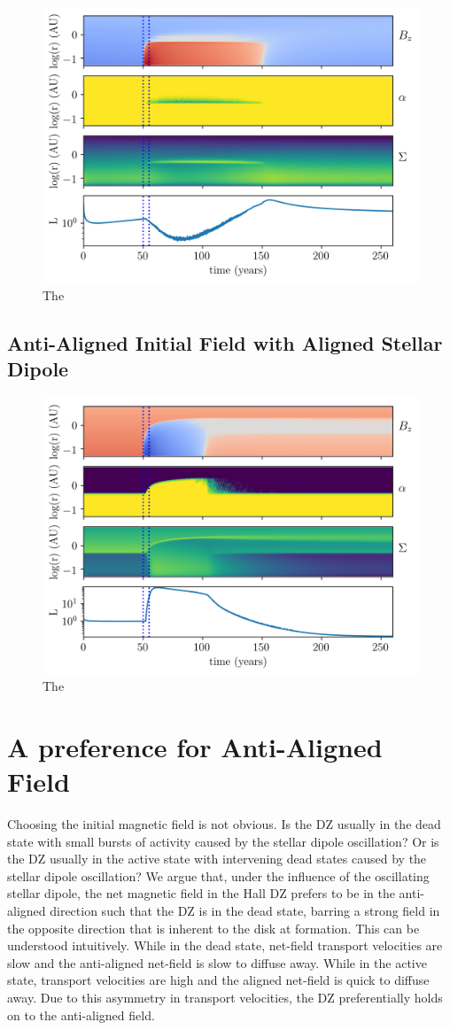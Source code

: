 \begin{figure}[p]
\centering
\includegraphics[width=0.7\columnwidth]{figs/figsChapter3/run3101/MST1.png}
\caption{The}
\label{fiStExample}
\end{figure}
 
\newpage
\subsection{Anti-Aligned Initial Field with Aligned Stellar Dipole}
 
\begin{figure}[p]
\centering
\includegraphics[width=0.7\columnwidth]{figs/figsChapter3/run3100/MST1.png}
\caption{The}
\label{fiStExample}
\end{figure}



 
\newpage
\section{A preference for Anti-Aligned Field}
Choosing the initial magnetic field is not obvious.  Is the DZ usually in the dead state with small bursts of activity caused by the stellar dipole oscillation?  Or is the DZ usually in the active state with intervening dead states caused by the stellar dipole oscillation?  We argue that, under the influence of the oscillating stellar dipole, the net magnetic field in the Hall DZ prefers to be in the anti-aligned direction such that the DZ is in the dead state, barring a strong field in the opposite direction that is inherent to the disk at formation.  This can be understood intuitively.  While in the dead state, net-field transport velocities are slow and the anti-aligned net-field is slow to diffuse away.  While in the active state, transport velocities are high and the aligned net-field is quick to diffuse away.  Due to this asymmetry in transport velocities, the DZ preferentially holds on to the anti-aligned field.

